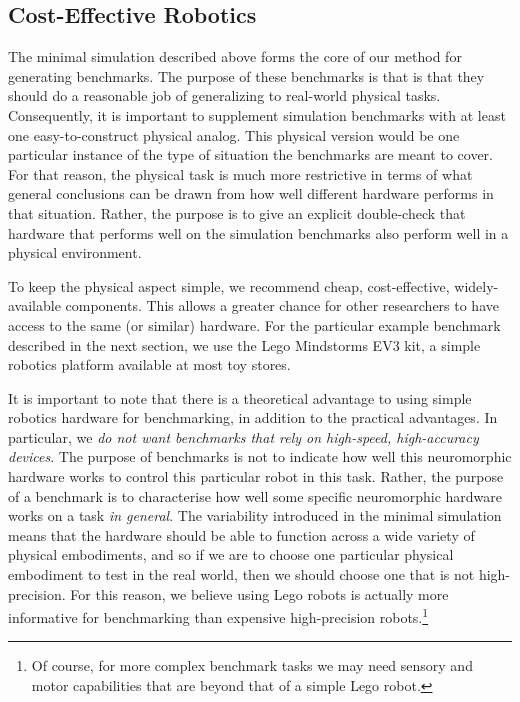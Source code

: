 \documentclass{frontiersSCNS} %
\begin{document}
\subsection{Cost-Effective Robotics}

The minimal simulation described above forms the core of our method for generating benchmarks.
The purpose of these benchmarks is that is that they should do a reasonable job
of generalizing to real-world physical tasks.  Consequently, it is important to
supplement simulation benchmarks with at least one easy-to-construct 
physical analog.  This physical version would be one particular instance of the
type of situation the benchmarks are meant to cover.  For that reason, the physical task
is much more restrictive in terms of what general conclusions can be drawn
from how well different hardware performs in that situation.  Rather, the purpose is to give
an explicit double-check that hardware that performs
well on the simulation benchmarks also perform well in a physical environment.

To keep the physical aspect simple, we recommend cheap, cost-effective, 
widely-available
components.  This allows a greater chance for other researchers to have
access to the same (or similar) hardware.  For the particular example 
benchmark described in the next section, we use the Lego Mindstorms EV3 kit,
a simple robotics platform available at most toy stores.

It is important to note that there is a theoretical advantage to
using simple robotics hardware for benchmarking, in addition to the practical
advantages.  In particular, we \emph{do not want benchmarks that rely on
high-speed, high-accuracy devices}.  The purpose of benchmarks
is not to indicate how well this neuromorphic hardware works to control this
particular robot in this task.  Rather, the purpose of a benchmark is to
characterise how well some specific neuromorphic hardware works on a task 
\emph{in general}.  The variability introduced in the minimal simulation means that the hardware
should be able to function across a wide variety of physical embodiments, and
so if we are to choose one particular physical embodiment to test in the
real world, then we should choose one that is not high-precision.
For this reason, we believe using Lego robots is actually more informative
for benchmarking than expensive high-precision robots.\footnote{Of course,
for more complex benchmark tasks we may need sensory and motor capabilities
that are beyond that of a simple Lego robot.}
\end{document}
